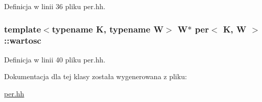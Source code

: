 Definicja w linii 36 pliku per.\-hh.

\hypertarget{classper_a226a74072ab3ff12f6c31e27190762a0}{
\subsubsection[{wartosc}]{\setlength{\rightskip}{0pt plus 5cm}template$<$typename K, typename W$>$ W$\ast$ {\bf per}$<$ K, W $>$\-::wartosc}}\label{classper_a226a74072ab3ff12f6c31e27190762a0}


Definicja w linii 40 pliku per.\-hh.



Dokumentacja dla tej klasy została wygenerowana z pliku\-:\begin{DoxyCompactItemize}
\item 
\hyperlink{per_8hh}{per.\-hh}\end{DoxyCompactItemize}
